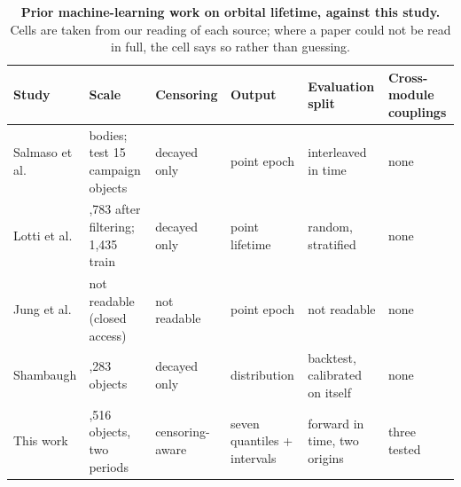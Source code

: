 \documentclass[3p,times,twocolumn]{elsarticle}
\begin{document}
\begin{table}[t]
\centering
\footnotesize
\caption{\textbf{Prior machine-learning work on orbital lifetime,
against this study.} Cells are taken from our reading of each source;
where a paper could not be read in full, the cell says so rather than
guessing.}\label{tbl:gap}
\begin{tabular}{@{}
>{\raggedright\arraybackslash}p{}
  >{\raggedright\arraybackslash}p{}
  >{\raggedright\arraybackslash}p{}
  >{\raggedright\arraybackslash}p{}
  >{\raggedright\arraybackslash}p{}
  >{\raggedright\arraybackslash}p{}@{}}
\toprule\noalign{}
\begin{minipage}[b]{\linewidth}\raggedright
Study
\end{minipage} & \begin{minipage}[b]{\linewidth}\raggedright
Scale
\end{minipage} & \begin{minipage}[b]{\linewidth}\raggedright
Censoring
\end{minipage} & \begin{minipage}[b]{\linewidth}\raggedright
Output
\end{minipage} & \begin{minipage}[b]{\linewidth}\raggedright
Evaluation split
\end{minipage} & \begin{minipage}[b]{\linewidth}\raggedright
Cross-module couplings
\end{minipage} \\
\midrule\noalign{}

\bottomrule\noalign{}

Salmaso et al. \citep{salmaso2023machine} & 417 bodies; test 15 campaign
objects & decayed only & point epoch & interleaved in time & none \\
Lotti et al. \citep{lotti2025exploring} & 1,783 after filtering; 1,435
train & decayed only & point lifetime & random, stratified & none \\
Jung et al. \citep{jung2021recurrent} & not readable (closed access) &
not readable & point epoch & not readable & none \\
Shambaugh \citep{shambaugh2026validation} & 1,283 objects & decayed only
& distribution & backtest, calibrated on itself & none \\
This work & 64,516 objects, two periods & censoring-aware & seven
quantiles + intervals & forward in time, two origins & three tested \\
\end{tabular}
\end{table}
\end{document}
